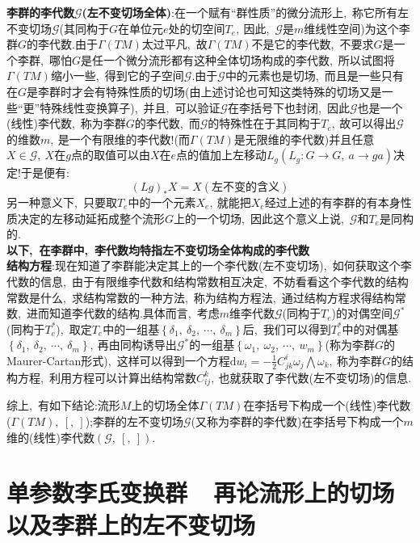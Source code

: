 \textbf{李群的李代数$\mathcal{G}$(左不变切场全体)}:在一个赋有“群性质”的微分流形上,\ 称它所有左不变切场$\mathcal{G}$(其同构于$G$在单位元$e$处的切空间$T_e,\ $因此,\ $\mathcal{G}$是$m$维线性空间)为这个李群$G$的李代数.由于$\Gamma(TM)$太过平凡,\ 故$\Gamma(TM)$不是它的李代数,\ 不要求$G$是一个李群,\ 哪怕$G$是任一个微分流形都有这种全体切场构成的李代数,\ 所以试图将$\Gamma(TM)$缩小一些,\ 得到它的子空间$\mathcal{G}.$由于$\mathcal{G}$中的元素也是切场,\ 而且是一些只有在$G$是李群时才会有特殊性质的切场(由上述讨论也可知这类特殊的切场又是一些“更”特殊线性变换算子),\ 并且,\ 可以验证$\mathcal{G}$在李括号下也封闭,\ 因此$\mathcal{G}$也是一个(线性)李代数,\ 称为李群$G$的李代数,\ 而$\mathcal{G}$的特殊性在于其同构于$T_e,\ $故可以得出$\mathcal{G}$的维数$m,\ $是一个有限维的李代数!(而$\Gamma(TM)$是无限维的李代数)并且任意$X\in\mathcal{G},\ X$在$g$点的取值可以由$X$在$e$点的值加上左移动$L_g(L_g:G\rightarrow G,\ a\rightarrow ga)$决定!于是便有:
$$(Lg)_* X=X(\text{左不变的含义})$$
另一种意义下,\ 只要取$T_e$中的一个元素$X_e,\ $就能把$X_e$经过上述的有李群的有本身性质决定的左移动延拓成整个流形$G$上的一个切场,\ 因此这个意义上说,\ $\mathcal{G}$和$T_e$是同构的.\\
\textbf{以下,\ 在李群中,\ 李代数均特指左不变切场全体构成的李代数}\\
\textbf{结构方程}:现在知道了李群能决定其上的一个李代数(左不变切场),\ 如何获取这个李代数的信息,\ 由于有限维李代数和结构常数相互决定,\ 不妨看看这个李代数的结构常数是什么,\ 求结构常数的一种方法,\ 称为结构方程法,\ 通过结构方程求得结构常数,\ 进而知道李代数的结构.具体而言,\ 考虑$m$维李代数$\mathcal{G}$(同构于$T_e$)的对偶空间$\mathcal{G^*}$(同构于$T_e^*$),\ 取定$T_e$中的一组基$\left\{\delta_1,\ \delta_2,\ \cdots,\ \delta_m\right\}$后,\ 我们可以得到$T_e^*$中的对偶基$\left\{\delta_1,\ \delta_2,\ \cdots,\ \delta_m\right\},\ $再由同构诱导出$\mathcal{G}^*$的一组基$\left\{\omega_1,\ \omega_2,\ \cdots,\ w_m\right\}$(称为李群$G$的Maurer-Cartan形式),\ 这样可以得到一个方程$\mathrm{d}w_i=-\frac{1}{2}C_{jk}^{i}\omega_j\bigwedge \omega_k,\ $称为李群$G$的结构方程,\ 利用方程可以计算出结构常数$C_{ij}^{k},\ $也就获取了李代数(左不变切场)的信息.

综上,\ 有如下结论:流形$M$上的切场全体$\Gamma(TM)$在李括号下构成一个(线性)李代数($\Gamma(TM),\ [,\ ]$);李群的左不变切场$\mathcal{G}$(又称为李群的李代数)在李括号下构成一个$m$维的(线性)李代数$(\mathcal{G},\ [,\ ]).$

\section{单参数李氏变换群\ \raisebox{0.5mm}{------}\ 再论流形上的切场以及李群上的左不变切场}

